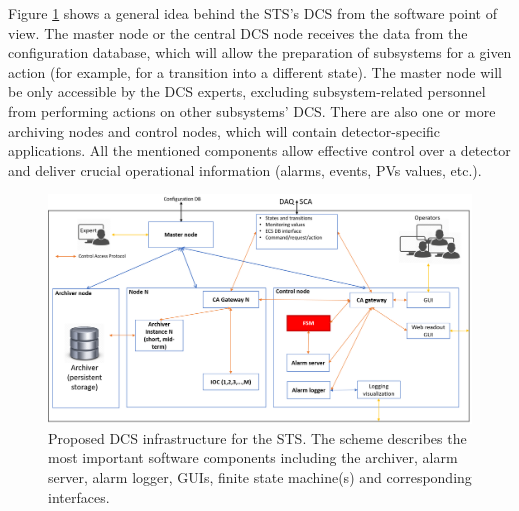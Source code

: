 Figure \ref{fig_arch} shows a general idea behind the \gls{STS}'s \gls{DCS} from the software point of view.  The master node or the central \gls{DCS} node receives the data from the configuration database, which will allow the preparation of subsystems for a given action (for example, for a transition into a different state). The master node will be only accessible by the \gls{DCS} experts, excluding subsystem-related personnel from performing actions on other subsystems' \gls{DCS}. There are also one or more archiving nodes and control nodes, which will contain detector-specific applications. All the mentioned components allow effective control over a detector and deliver crucial operational information (alarms, events, \glspl{PV} values, etc.). 

\begin{figure}[!h]
\centering
\includegraphics[width=1\columnwidth]{Chapter3/Controls/images/DCS.png}
\caption{Proposed \gls{DCS} infrastructure for the \gls{STS}. The scheme describes the most important software components including the archiver, alarm server, alarm logger, GUIs, finite state machine(s) and corresponding interfaces.}
\label{fig_arch}
\end{figure}
\newpage






